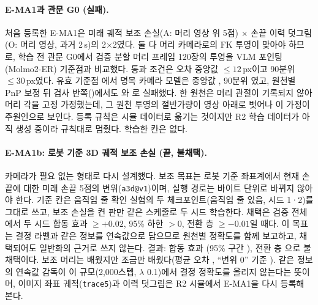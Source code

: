 \paragraph{E-MA1과 관문 G0 (실패).} 처음 등록한 E-MA1은 미래 궤적 보조 손실(A: 머리 영상 위 5점) $\times$ 손끝 이력 덧그림(O: 머리 영상, 과거 2\,s)의 2$\times$2였다. 둘 다 머리 카메라로의 FK 투영이 맞아야 하므로, 학습 전 관문 G0에서 검증 분할 머리 프레임 120장의 투영을 VLM 포인팅(Molmo2-ER) 기준점과 비교했다. 통과 조건은 오차 중앙값 $\le12$\,px이고 90분위 $\le30$\,px였다. 유효 기준점 에서 명목 카메라 모델은 중앙값 , 90분위 였고, 원천별 PnP 보정 뒤 검사 반쪽()에서도 와 로 실패했다. 한 원천은 머리 관절이 기록되지 않아 머리 각을 고정 가정했는데, 그 원천 투영의 절반가량이 영상 아래로 벗어나 이 가정이 주원인으로 보인다. 등록 규칙은 시뮬 데이터로 옮기는 것이지만 R2 학습 데이터가 아직 생성 중이라 규칙대로 멈췄다. 학습한 칸은 없다.

\paragraph{E-MA1b: 로봇 기준 3D 궤적 보조 손실 (끝, 불채택).} 카메라가 필요 없는 형태로 다시 설계했다. 보조 목표는 로봇 기준 좌표계에서 현재 손끝에 대한 미래 손끝 5점의 변위(\texttt{a3d@v1})이며, 실행 경로는 바이트 단위로 바뀌지 않아야 한다. 기준 칸은 움직임 줄 확인 실험의 두 체크포인트(움직임 줄 있음, 시드 1·2)를 그대로 쓰고, 보조 손실을 켠 판만 같은 스케줄로 두 시드 학습한다. 채택은 검증 전체에서 두 시드 합동 효과 $\ge+0.02$, 95\% 하한 $>0$, 전환 층 $\ge-0.01$일 때다. 이 목표는 결정 라벨과 같은 정보를 연속값으로 담으므로 원천별 정확도를 함께 보고하고, 채택되어도 일반화의 근거로 쓰지 않는다. 결과: 합동 효과 (95\% 구간 \tentative{[$-$0.0022, +0.0085]}), 전환 층 으로 불채택이다. 보조 머리는 배웠지만 조금만 배웠다(평균 오차 , ``변위 0'' 기준 ). 같은 정보의 연속값 감독이 이 규모(2,000스텝, $\lambda$ 0.1)에서 결정 정확도를 올리지 않는다는 뜻이며, 이미지 좌표 궤적(\texttt{trace5})과 이력 덧그림은 R2 시뮬에서 E-MA1을 다시 등록해 본다.


